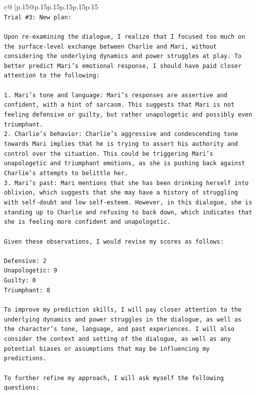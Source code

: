 \documentclass{article}
\begin{document}
{\begin{supertabular}{c@{$\;$}|p{.15\linewidth}@{}p{.15\linewidth}p{.15\linewidth}p{.15\linewidth}p{.15\linewidth}p{.15\linewidth}}
{{{\\ 
\texttt{Trial \#3: New plan: } \\
\\ 
\texttt{Upon re{-}examining the dialogue, I realize that I focused too much on the surface{-}level exchange between Charlie and Mari, without considering the underlying dynamics and power struggles at play. To better predict Mari's emotional response, I should have paid closer attention to the following:} \\
\\ 
\texttt{1. Mari's tone and language: Mari's responses are assertive and confident, with a hint of sarcasm. This suggests that Mari is not feeling defensive or guilty, but rather unapologetic and possibly even triumphant.} \\
\texttt{2. Charlie's behavior: Charlie's aggressive and condescending tone towards Mari implies that he is trying to assert his authority and control over the situation. This could be triggering Mari's unapologetic and triumphant emotions, as she is pushing back against Charlie's attempts to belittle her.} \\
\texttt{3. Mari's past: Mari mentions that she has been drinking herself into oblivion, which suggests that she may have a history of struggling with self{-}doubt and low self{-}esteem. However, in this dialogue, she is standing up to Charlie and refusing to back down, which indicates that she is feeling more confident and unapologetic.} \\
\\ 
\texttt{Given these observations, I would revise my scores as follows:} \\
\\ 
\texttt{Defensive: 2} \\
\texttt{Unapologetic: 9} \\
\texttt{Guilty: 0} \\
\texttt{Triumphant: 8} \\
\\ 
\texttt{To improve my prediction skills, I will pay closer attention to the underlying dynamics and power struggles in the dialogue, as well as the character's tone, language, and past experiences. I will also consider the context and setting of the dialogue, as well as any potential biases or assumptions that may be influencing my predictions.} \\
\\ 
\texttt{To further refine my approach, I will ask myself the following questions:} \\
}}}
\end{supertabular}}
\end{document}
